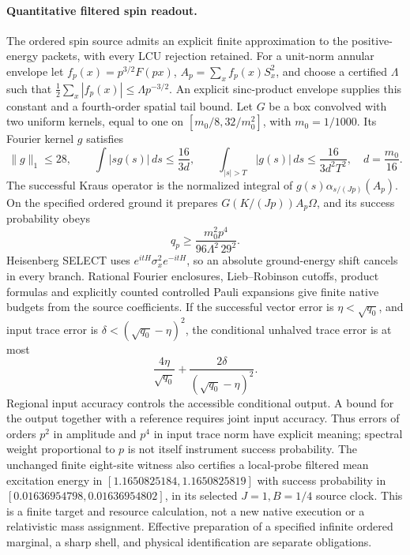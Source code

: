 \paragraph{Quantitative filtered spin readout.}
The ordered spin source admits an explicit finite approximation to the
positive-energy packets, with every LCU rejection retained.
For a unit-norm annular envelope let
\(f_p(x)=p^{3/2}F(px)\), \(A_p=\sum_xf_p(x)S_x^2\), and choose a certified
\(\Lambda\) such that \(\frac12\sum_x|f_p(x)|\leq\Lambda p^{-3/2}\).
An explicit sinc-product envelope supplies this constant and a fourth-order
spatial tail bound. Let \(G\) be a box convolved with two uniform kernels,
equal to one on \([m_0/8,32/m_0^2]\), with \(m_0=1/1000\).
Its Fourier kernel \(g\) satisfies
\[
 \|g\|_1\leq28,\qquad
 \int |s g(s)|\,ds\leq\frac{16}{3d},\qquad
 \int_{|s|>T}|g(s)|\,ds\leq\frac{16}{3d^2T^2},
 \quad d=\frac{m_0}{16}.
\]
The successful Kraus operator is the normalized integral of
\(g(s)\alpha_{s/(Jp)}(A_p)\). On the specified ordered ground it prepares
\(G(K/(Jp))A_p\Omega\), and its success probability obeys
\[
 q_p\geq\frac{m_0^2p^4}{96\Lambda^2\,29^2}.
\]
Heisenberg SELECT uses \(e^{itH}\sigma_x^2e^{-itH}\), so an absolute
ground-energy shift cancels in every branch. Rational Fourier enclosures,
Lieb--Robinson cutoffs, product formulas and explicitly counted controlled
Pauli expansions give finite native budgets from the source coefficients. If the successful
vector error is \(\eta<\sqrt{q_0}\), and input trace error is
\(\delta<(\sqrt{q_0}-\eta)^2\), the conditional unhalved trace error is at most
\[
 \frac{4\eta}{\sqrt{q_0}}
 +\frac{2\delta}{(\sqrt{q_0}-\eta)^2}.
\]
Regional input accuracy controls the accessible conditional output.
A bound for the output together with a reference requires joint input accuracy.
Thus errors of orders \(p^2\) in amplitude and \(p^4\) in input trace norm
have explicit meaning; spectral weight proportional to \(p\) is not itself
instrument success probability. The unchanged finite eight-site witness
also certifies a local-probe filtered mean excitation energy in
\([1.1650825184,1.1650825819]\) with success probability in
\([0.01636954798,0.01636954802]\), in its selected \(J=1,B=1/4\) source clock.
This is a finite target and resource calculation, not a new native execution
or a relativistic mass assignment. Effective preparation of a specified
infinite ordered marginal, a sharp shell, and physical identification are
separate obligations.
